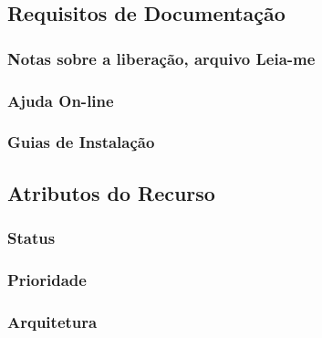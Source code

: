 \subsection{Requisitos de Documentação}

\subsubsection{	Notas sobre a liberação, arquivo Leia-me}

\subsubsection{Ajuda On-line}

\subsubsection{Guias de Instalação}

\subsection{Atributos do Recurso}

\subsubsection{Status}

\subsubsection{Prioridade}

\subsubsection{Arquitetura}